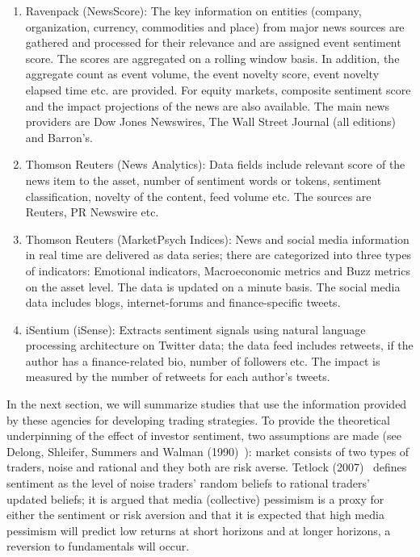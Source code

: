 \begin{enumerate}[--]
\item Ravenpack (NewsScore): The key information on entities (company, organization, currency, commodities and place) from major news sources are gathered and processed for their relevance and are assigned event sentiment score. The scores are aggregated on a rolling window basis. In addition, the aggregate count as event volume, the event novelty score, event novelty elapsed time etc. are provided. For equity markets, composite sentiment score and the impact projections of the news are also available. The main news providers are Dow Jones Newswires, The Wall Street Journal (all editions) and Barron's. 

\item Thomson Reuters (News Analytics): Data fields include relevant score of the news item to the asset, number of sentiment words or tokens, sentiment classification, novelty of the content, feed volume etc. The sources are Reuters, PR Newswire etc. 

\item Thomson Reuters (MarketPsych Indices): News and social media information in real time are delivered as data series; there are categorized into three types of indicators: Emotional indicators, Macroeconomic metrics and Buzz metrics on the asset level. The data is updated on a minute basis. The social media data includes blogs, internet-forums and finance-specific tweets.

\item iSentium (iSense): Extracts sentiment signals using natural language processing architecture on Twitter data; the data feed includes retweets, if the author has a finance-related bio, number of followers etc. The impact is measured by the number of retweets for each author's tweets. 
\end{enumerate}


In the next section, we will summarize studies that use the information provided by these agencies for developing trading strategies. To provide the theoretical underpinning of the effect of investor sentiment, two assumptions are made (see Delong, Shleifer, Summers and Walman (1990)~\cite{ssw}): market consists of two types of traders, noise and rational and they both are risk averse. Tetlock (2007)~\cite{tetlock2007giving} defines sentiment as the level of noise traders' random beliefs to rational traders' updated beliefs; it is argued that media (collective) pessimism is a proxy for either the sentiment or risk aversion and that it is expected that high media pessimism will predict low returns at short horizons and at longer horizons, a reversion to fundamentals will occur. 



